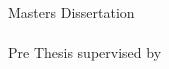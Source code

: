\begin{titlepage}
\color{PANTONECoolGray7C}
\thelogo
\leading{20.4pt}
{\Large
\theauthor
\\
%
\\
\textbf{\thetitleA}
\\
\textbf{\thetitleB}
\\
\textbf{\thetitleC}
}

\vspace{55.2mm}
\leading{16.8pt}
{\large
Masters Dissertation
\\
\themasters
\\
\thearea
Pre Thesis supervised by
\\
\textbf{\thesupervisor}
\\
\thecosupervisor}

\vspace*{\fill}
{\footnotesize \myear}
\end{titlepage}




